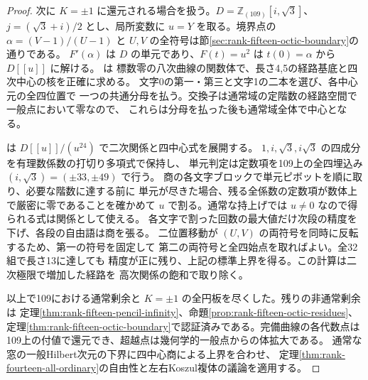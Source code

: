 \begin{proof}
次に $K=\pm1$ に還元される場合を扱う。$D=\mathbb Z_{(109)}[i,\sqrt3]$、
$j=(\sqrt3+i)/2$ とし、局所変数に $u=Y$ を取る。境界点の
$\alpha=(V-1)/(U-1)$ と $U,V$ の全符号は節\ref{sec:rank-fifteen-octic-boundary}の通りである。
$F'(\alpha)$ は $D$ の単元であり、$F(t)=u^2$ は $t(0)=\alpha$ から
$D[[u]]$ に解ける。 は
標数零の八次曲線の関数体で、長さ4,5の経路基底と四次中心の核を正確に求める。
文字0の第一・第三と文字1の二本を選び、各中心元の全四位置で
一つの共通分母を払う。交換子は通常域の定階数の経路空間で一般点において零なので、
これらは分母を払った後も通常域全体で中心となる。

 は
$D[[u]]/(u^{24})$ で二次関係と四中心式を展開する。
$1,i,\sqrt3,i\sqrt3$ の四成分を有理数係数の打切り多項式で保持し、
単元判定は定数項を109上の全四埋込み $(i,\sqrt3)=(\pm33,\pm49)$ で行う。
商の各文字ブロックで単元ピボットを順に取り、必要な階数に達する前に
単元が尽きた場合、残る全係数の定数項が数体上で厳密に零であることを確かめて
$u$ で割る。通常な持上げでは $u\ne0$ なので得られる式は関係として使える。
各文字で割った回数の最大値だけ次段の精度を下げ、各段の自由語は商を張る。
二位置移動が $(U,V)$ の両符号を同時に反転するため、第一の符号を固定して
第二の両符号と全四始点を取ればよい。全32組で長さ13に達しても
精度が正に残り、上記の標準上界を得る。この計算は二次極限で増加した経路を
高次関係の飽和で取り除く。

以上で109における通常剰余と $K=\pm1$ の全円板を尽くした。残りの非通常剰余は
定理\ref{thm:rank-fifteen-pencil-infinity}、命題\ref{prop:rank-fifteen-octic-residues}、
定理\ref{thm:rank-fifteen-octic-boundary}で認証済みである。完備曲線の各代数点は
109上の付値で還元でき、超越点は幾何学的一般点からの体拡大である。
通常な窓の一般Hilbert次元の下界に四中心商による上界を合わせ、
定理\ref{thm:rank-fourteen-all-ordinary}の自由性と左右Koszul複体の議論を適用する。
\end{proof}
